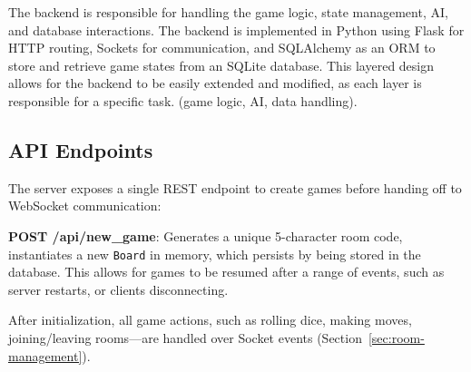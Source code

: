 The backend is responsible for handling the game logic, state management, AI, and database interactions. The backend is implemented in Python using Flask for HTTP routing, Sockets for communication, and SQLAlchemy as an ORM to store and retrieve game states from an SQLite database. 
This layered design allows for the backend to be easily extended and modified, as each layer is responsible for a specific task. (game logic, AI, data handling).

\subsection{API Endpoints}
The server exposes a single REST endpoint to create games before handing off to WebSocket communication:

\textbf{POST /api/new\_game}: Generates a unique 5-character room code, instantiates a new \texttt{Board} in memory, which persists by being stored in the database. This allows for games to be resumed after a range of events, such as server restarts, or clients disconnecting. 

After initialization, all game actions, such as rolling dice, making moves, joining/leaving rooms—are handled over Socket events (Section~\ref{sec:room-management}).


